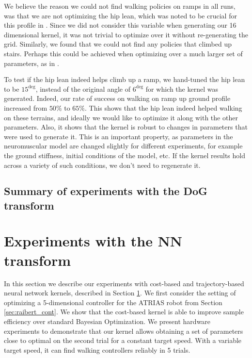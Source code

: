 We believe the reason we could not find walking policies on ramps in all runs, was that we are not optimizing the hip lean, which was noted to be crucial for this profile in \cite{song2015neural}. Since we did not consider this variable when generating our 16 dimensional kernel, it was not trivial to optimize over it without re-generating the grid. Similarly, we found that we could not find any policies that climbed up stairs. Perhaps this could be achieved when optimizing over a much larger set of parameters, as in \cite{song2015neural}. 

To test if the hip lean indeed helps climb up a ramp, we hand-tuned the hip lean to be $15^{\deg}$, instead of the original angle of $6^{\deg}$ for which the kernel was generated. Indeed, our rate of success on walking on ramp up ground profile increased from $50\%$ to $65\%$. %
This shows that the hip lean indeed helped walking on these terrains, and ideally we would like to optimize it along with the other parameters. Also, it shows that the \dogkernel kernel is robust to changes in parameters that were used to generate it. This is an important property, as parameters in the neuromuscular model are changed slightly for different experiments, for example the ground stiffness, initial conditions of the model, etc. If the kernel results hold across a variety of such conditions, we don't need to regenerate it.


\subsection{Summary of experiments with the DoG transform}


\section{Experiments with the NN transform}

In this section we describe our experiments with cost-based and trajectory-based neural network kernels, described in Section \ref{}. We first consider the setting of optimizing a 5-dimensional controller for the ATRIAS robot from Section \ref{sec:raibert_cont}. We show that the cost-based kernel is able to improve sample efficiency over standard Bayesian Optimization. We present hardware experiments to demonstrate that our kernel allows obtaining a set of parameters close to optimal on the second trial for a constant target speed. With a variable target speed, it can find walking controllers reliably in 5 trials.


